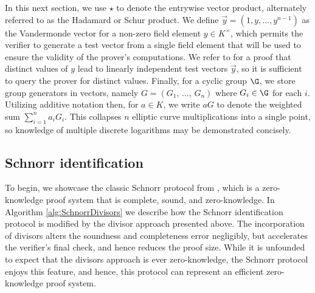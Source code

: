 \documentclass[11pt,letterpaper]{article}
\theoremstyle{definition}
\newcommand{\6}{\mathbf}
\newcommand{\7}{\mathcal}
\newcommand{\lsamp}{\xleftarrow{\$}}
\begin{document}
In this next section, we use $\star$ to denote the entrywise vector product, alternately referred to as the Hadamard or Schur product. 
We define $\vec{y} = (1, y, \dots, y^{n-1})$ as the Vandermonde vector for a non-zero field element $y \in K^\times$, which permits the verifier to generate a test vector from a single field element that will be used to ensure the validity of the prover's computations.  
We refer to \cite{HammR} for a proof that distinct values of $y$ lead to linearly independent test vectors $\vec{y}$, so it is sufficient to query the prover for distinct values.
Finally, for a cyclic group $\G$, we store group generators in vectors, namely $G = (G_1, \, \dots, \, G_n)$ where $G_i \in \G$ for each $i$.
Utilizing additive notation then, for $a \in K$, we write $a G$ to denote the weighted sum $\sum_{i=1}^n a_i G_i$. 
This collapses $n$ elliptic curve multiplications into a single point, so knowledge of multiple discrete logarithms may be demonstrated concisely.







\subsection{Schnorr identification}

To begin, we showcase the classic Schnorr protocol from \cite{Schnorr}, which is a zero-knowledge proof system that is complete, sound, and zero-knowledge.
In Algorithm \ref{alg:SchnorrDivisors} we describe how the Schnorr identification protocol is modified by the divisor approach presented above.
The incorporation of divisors alters the soundness and completeness error negligibly, but accelerates the verifier's final check, and hence reduces the proof size. 
While it is unfounded to expect that the divisors approach is ever zero-knowledge, the Schnorr protocol enjoys this feature, and hence, this protocol can represent an efficient zero-knowledge proof system.



\end{document}
